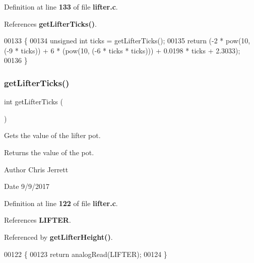 Definition at line \textbf{ 133} of file \textbf{ lifter.\+c}.



References \textbf{ get\+Lifter\+Ticks()}.


\begin{DoxyCode}
00133                          \{
00134   \textcolor{keywordtype}{unsigned} \textcolor{keywordtype}{int} ticks = getLifterTicks();
00135   \textcolor{keywordflow}{return} (-2 * pow(10, (-9 * ticks)) + 6 * (pow(10, (-6 * ticks * ticks))) + 0.0198 * ticks + 2.3033);
00136 \}
\end{DoxyCode}
\mbox{\label{lifter_8h_acdf909159b0406c48099843f2306be78}} 
\subsubsection{get\+Lifter\+Ticks()}
{\footnotesize\ttfamily int get\+Lifter\+Ticks (\begin{DoxyParamCaption}{ }\end{DoxyParamCaption})}



Gets the value of the lifter pot. 

\begin{DoxyReturn}{Returns}
the value of the pot. 
\end{DoxyReturn}
\begin{DoxyAuthor}{Author}
Chris Jerrett 
\end{DoxyAuthor}
\begin{DoxyDate}{Date}
9/9/2017 
\end{DoxyDate}


Definition at line \textbf{ 122} of file \textbf{ lifter.\+c}.



References \textbf{ L\+I\+F\+T\+ER}.



Referenced by \textbf{ get\+Lifter\+Height()}.


\begin{DoxyCode}
00122                      \{
00123   \textcolor{keywordflow}{return} analogRead(LIFTER);
00124 \}
\end{DoxyCode}
\mbox{\label{lifter_8h_ab0460888f3213e5510bd25ae1e152a75}} 
